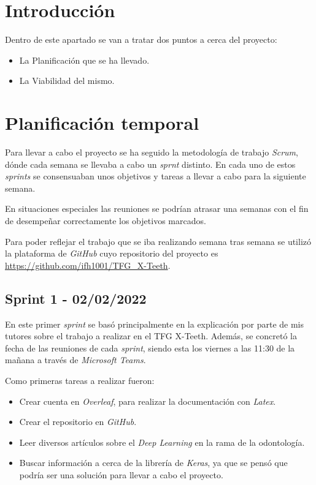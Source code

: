 
\section{Introducción}
Dentro de este apartado se van a tratar dos puntos a cerca del proyecto:
\begin{itemize}
    \item La Planificación que se ha llevado.
    \item La Viabilidad del mismo.
\end{itemize}
\section{Planificación temporal}
Para llevar a cabo el proyecto se ha seguido la metodología de trabajo \emph{Scrum}, dónde cada semana se llevaba a cabo un \emph{sprnt} distinto. En cada uno de estos \emph{sprints} se consensuaban unos objetivos y tareas a llevar a cabo para la siguiente semana.

En situaciones especiales las reuniones se podrían atrasar una semanas con el fin de desempeñar correctamente los objetivos marcados.

Para poder reflejar el trabajo que se iba realizando semana tras semana se utilizó la plataforma de \emph{GitHub} cuyo repositorio del proyecto es \url{https://github.com/ifh1001/TFG_X-Teeth}.

\subsection{Sprint 1 - 02/02/2022}
En este primer \emph{sprint} se basó principalmente en la explicación por parte de mis tutores sobre el trabajo a realizar en el TFG X-Teeth. Además, se concretó la fecha de las reuniones de cada \emph{sprint}, siendo esta los viernes a las 11:30 de la mañana a través de \emph{Microsoft Teams}.

Como primeras tareas a realizar fueron:
\begin{itemize}
    \item Crear cuenta en \emph{Overleaf}, para realizar la documentación con \emph{Latex}.
    \item Crear el repositorio en \emph{GitHub}.
    \item Leer diversos artículos sobre el \emph{Deep Learning} en la rama de la odontología.
    \item Buscar información a cerca de la librería de \emph{Keras}, ya que se pensó que podría ser una solución para llevar a cabo el proyecto.
\end{itemize}
